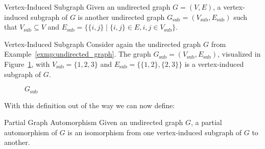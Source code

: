 \begin{defn}{Vertex-Induced Subgraph}
  Given an undirected graph $G = (V,E)$, a vertex-induced subgraph of $G$ is another
  undirected graph $G_{\mathrm{sub}} = (V_{\mathrm{sub}},E_{\mathrm{sub}})$ such
  that $V_{\mathrm{sub}} \subseteq V$ and $E_{\mathrm{sub}} = \{\{i,j\} \mid
  \{i, j\} \in E, i, j \in V_{\mathrm{sub}}\}$.
\end{defn}

\begin{exmp}{Vertex-Induced Subgraph}
  Consider again the undirected graph $G$ from
  Example~\ref{exmp:undirected_graph}.  The graph $G_{\mathrm{sub}} =
  (V_{\mathrm{sub}},E_{\mathrm{sub}})$, visualized in
  Figure~\ref{fig:vertex_induced_subgraph}, with $V_{\mathrm{sub}} = \{1,2,3\}$
  and $E_{\mathrm{sub}} = \{\{1,2\},\{2,3\}\}$ is a vertex-induced subgraph of
  $G$.
  \begin{figure}[H]
    \centering
    \caption{$G_{\mathrm{sub}}$}
    \label{fig:vertex_induced_subgraph}
  \end{figure}
\end{exmp}
%
With this definition out of the way we can now define:

\begin{defn}{Partial Graph Automorphism}
  Given an undirected graph $G$, a partial automorphism of $G$ is an
  isomorphism from one vertex-induced subgraph of $G$ to another.
\end{defn}

